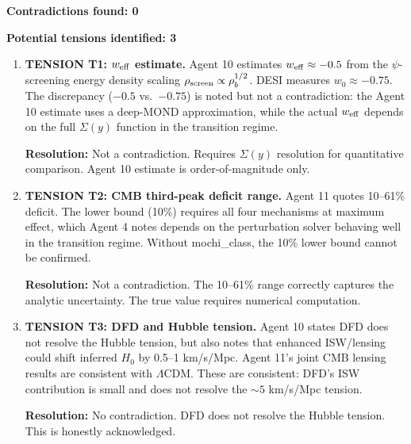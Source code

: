 \documentclass[11pt]{article}
\newcommand{\LCDM}{$\Lambda$CDM}
\newcommand{\Hzero}{H_0}
\begin{document}
\begin{tcolorbox}[colback=red!5!white, colframe=red!70!black,
  title=\textbf{CROSS-CHECK RESULTS}]

\textbf{Contradictions found: 0}

\textbf{Potential tensions identified: 3}

\begin{enumerate}

\item \textbf{TENSION T1: $w_{\rm eff}$ estimate.}
  Agent 10 estimates $w_{\rm eff} \approx -0.5$ from the $\psi$-screening
  energy density scaling $\rho_{\rm screen} \propto \rho_b^{1/2}$.
  DESI measures $w_0 \approx -0.75$. The discrepancy ($-0.5$ vs.\ $-0.75$)
  is noted but not a contradiction: the Agent 10 estimate uses a
  deep-MOND approximation, while the actual $w_{\rm eff}$ depends on
  the full $\Sigma(y)$ function in the transition regime.

  \textbf{Resolution:} Not a contradiction. Requires $\Sigma(y)$
  resolution for quantitative comparison. Agent 10 estimate is
  order-of-magnitude only.

\item \textbf{TENSION T2: CMB third-peak deficit range.}
  Agent 11 quotes 10--61\% deficit. The lower bound (10\%) requires
  all four mechanisms at maximum effect, which Agent 4 notes depends
  on the perturbation solver behaving well in the transition regime.
  Without mochi\_class, the 10\% lower bound cannot be confirmed.

  \textbf{Resolution:} Not a contradiction. The 10--61\% range
  correctly captures the analytic uncertainty. The true value requires
  numerical computation.

\item \textbf{TENSION T3: DFD and Hubble tension.}
  Agent 10 states DFD does not resolve the Hubble tension, but also
  notes that enhanced ISW/lensing could shift inferred $\Hzero$ by
  0.5--1 km/s/Mpc. Agent 11's joint CMB lensing results are consistent
  with \LCDM. These are consistent: DFD's ISW contribution is small
  and does not resolve the $\sim 5$ km/s/Mpc tension.

  \textbf{Resolution:} No contradiction. DFD does not resolve the
  Hubble tension. This is honestly acknowledged.

\end{enumerate}


\end{tcolorbox}
\end{document}
